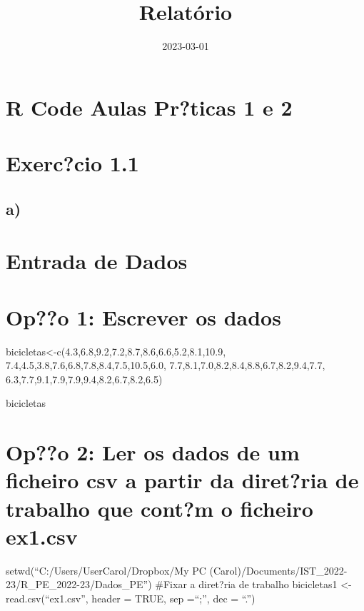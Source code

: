 \documentclass[
]{article}
\title{Relatório}
\author{}
\date{\vspace{-2.5em}2023-03-01}
\begin{document}
\maketitle

\hypertarget{r-code-aulas-prticas-1-e-2}{%
\section{R Code Aulas Pr?ticas 1 e 2}\label{r-code-aulas-prticas-1-e-2}}

\hypertarget{exerccio-1.1}{%
\section{Exerc?cio 1.1}\label{exerccio-1.1}}

\hypertarget{a}{%
\subsection{a)}\label{a}}

\hypertarget{entrada-de-dados}{%
\section{Entrada de Dados}\label{entrada-de-dados}}

\hypertarget{opo-1-escrever-os-dados}{%
\section{Op??o 1: Escrever os dados}\label{opo-1-escrever-os-dados}}

bicicletas\textless-c(4.3,6.8,9.2,7.2,8.7,8.6,6.6,5.2,8.1,10.9,
7.4,4.5,3.8,7.6,6.8,7.8,8.4,7.5,10.5,6.0,
7.7,8.1,7.0,8.2,8.4,8.8,6.7,8.2,9.4,7.7,
6.3,7.7,9.1,7.9,7.9,9.4,8.2,6.7,8.2,6.5)

bicicletas

\hypertarget{opo-2-ler-os-dados-de-um-ficheiro-csv-a-partir-da-diretria-de-trabalho-que-contm-o-ficheiro-ex1.csv}{%
\section{Op??o 2: Ler os dados de um ficheiro csv a partir da diret?ria
de trabalho que cont?m o ficheiro
ex1.csv}\label{opo-2-ler-os-dados-de-um-ficheiro-csv-a-partir-da-diretria-de-trabalho-que-contm-o-ficheiro-ex1.csv}}

setwd(``C:/Users/UserCarol/Dropbox/My PC
(Carol)/Documents/IST\_2022-23/R\_PE\_2022-23/Dados\_PE'') \#Fixar a
diret?ria de trabalho bicicletas1 \textless- read.csv(``ex1.csv'',
header = TRUE, sep =``;'', dec = ``.'')
\end{document}
